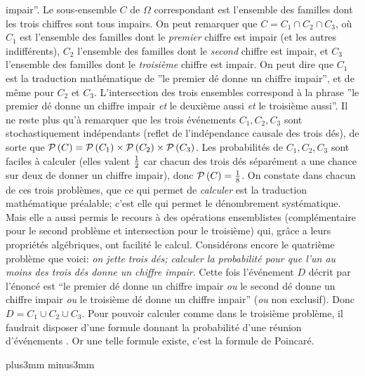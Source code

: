 impair''. Le sous-ensemble $C$ de $\Omega$ correspondant est l'ensemble
des familles dont les trois  chiffres sont tous impairs. On peut remarquer
que $C = C_1 \cap C_2 \cap  C_3$, o\`u $C_1$ est l'ensemble des
familles dont le {\it premier} chiffre est impair (et les autres
indiff\'erents), $C_2$ l'ensemble des familles dont le {\it second}
chiffre est impair, et $C_3$ l'ensemble des familles dont le {\it
troisi\`eme} chiffre est impair. On peut dire que  $C_1$ est la
traduction math\'ematique de ''le premier d\'e donne un chiffre impair'',
et de m\^eme pour $C_2$ et $C_3$. L'intersection des trois ensembles
correspond \`a la phrase ''le premier d\'e  donne un chiffre impair {\it et}
le deuxi\`eme aussi {\it  et} le troisi\`eme aussi''. Il ne reste plus qu'\`a
remarquer que les trois \'ev\'enements $C_1, C_2, C_3$ sont
stochastiquement ind\'ependants (reflet de l'ind\'ependance causale des
trois d\'es), de sorte que ${\cal P}\, (C) = {\cal P}\, (C_1) \times {\cal 
P}\, (C_2) \times {\cal P}\, (C_3)$. Les probabilit\'es de $C_1, C_2, C_3$
sont faciles \`a calculer (elles valent  ${1 \over 2}$ car chacun des trois
d\'es s\'epar\'ement a une chance sur deux de donner un chiffre impair),
donc ${\cal P}\, (C) = {1 \over 8}$. 
\medskip 
On constate dans chacun de ces trois probl\`emes, que ce qui permet de 
{\it calculer} est la traduction math\'ematique pr\'ealable; c'est elle 
qui permet le d\'enombrement syst\'ematique. Mais elle a aussi permis 
le recours \`a des op\'erations ensemblistes (compl\'ementaire pour le
second probl\`eme et intersection pour le troisi\`eme) qui, gr\^ace a
leurs  propri\'et\'es alg\'ebriques, ont facilit\'e le calcul. 
\medskip 
Consid\'erons encore le quatri\`eme probl\`eme que voici: {\sl on jette
trois d\'es; calculer la probabilit\'e pour que l'un au moins des trois
d\'es donne un chiffre impair}. Cette fois l'\'ev\'enement $D$ d\'ecrit
par l'\'enonc\'e est ``le premier d\'e donne un chiffre impair {\it ou} le
second d\'e donne un  chiffre impair {\it ou} le troisi\`eme d\'e donne 
un chiffre impair'' ({\it ou} non exclusif). Donc $D = C_1 \cup C_2 \cup
C_3$. Pour pouvoir calculer comme dans le troisi\`eme probl\`eme, il
faudrait disposer  d'une formule donnant la probabilit\'e d'une r\'eunion
d'\'ev\'enements . Or
une telle formule existe, c'est la formule de Poincar\'e.

\vskip6mm plus3mm minus3mm


